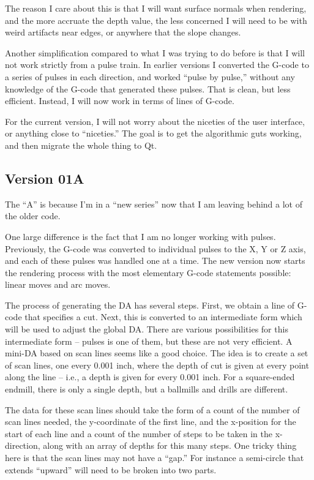 \documentclass[titlepage,oneside,10pt]{article}
\begin{document}
The reason I care about this is that I will want surface normals when
rendering, and the more accruate the depth value, the less concerned I
will need to be with weird artifacts near edges, or anywhere that the
slope changes.

Another simplification compared to what I was trying to do before is
that I will not work strictly from a pulse train. In earlier versions
I converted the G-code to a series of pulses in each direction, and
worked ``pulse by pulse,'' without any knowledge of the G-code that
generated these pulses. That is clean, but less efficient. Instead,
I will now work in terms of lines of G-code.

For the current version, I will not worry about the niceties of the
user interface, or anything close to ``niceties.'' The goal is to get
the algorithmic guts working, and then migrate the whole thing to Qt.

\subsection{Version 01A}

The ``A'' is because I'm in a ``new series'' now that I am leaving
behind a lot of the older code.

One large difference is the fact that I am no longer working with
pulses. Previously, the G-code was converted to individual pulses to
the X, Y or Z axis, and each of these pulses was handled one at a
time. The new version now starts the rendering process with the most
elementary G-code statements possible: linear moves and arc moves.

The process of generating the DA has several steps. First, we obtain
a line of G-code that specifies a cut. Next, this is converted to an
intermediate form which will be used to adjust the global DA. There
are various possibilities for this intermediate form -- pulses is one
of them, but these are not very efficient. A mini-DA based on scan
lines seems like a good choice. The idea is to create a set of scan
lines, one every 0.001 inch, where the depth of cut is given at every
point along the line -- i.e., a depth is given for every 0.001
inch. For a square-ended endmill, there is only a single depth, but a
ballmills and drills are different.

The data for these scan lines should take the form of a count of the
number of scan lines needed, the y-coordinate of the first line, and
the x-position for the start of each line and a count of the number of
steps to be taken in the x-direction, along with an array of depths
for this many steps. One tricky thing here is that the scan lines may
not have a ``gap.'' For instance a semi-circle that extends ``upward''
will need to be broken into two parts.
\end{document}

